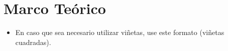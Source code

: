 \chapter{Marco Teórico}





\begin{itemize}
\item En caso que sea necesario utilizar vi\~{n}etas, use este formato (vi\~{n}etas cuadradas).
\end{itemize}
